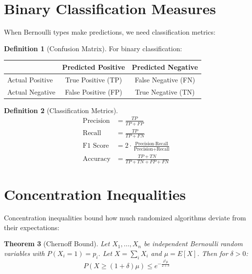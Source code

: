 \documentclass[11pt,twoside,openright]{book}
\theoremstyle{definition}
\newtheorem{definition}{Definition}[chapter]
\theoremstyle{plain}
\newtheorem{theorem}[definition]{Theorem}
\theoremstyle{remark}
\begin{document}
\section{Binary Classification Measures}

When Bernoulli types make predictions, we need classification metrics:

\begin{definition}[Confusion Matrix]
For binary classification:
\begin{center}
\begin{tabular}{l|cc}
& Predicted Positive & Predicted Negative \\
\hline
Actual Positive & True Positive (TP) & False Negative (FN) \\
Actual Negative & False Positive (FP) & True Negative (TN) \\
\end{tabular}
\end{center}
\end{definition}

\begin{definition}[Classification Metrics]
\begin{align}
\text{Precision} &= \frac{TP}{TP + FP} \\
\text{Recall} &= \frac{TP}{TP + FN} \\
\text{F1 Score} &= 2 \cdot \frac{\text{Precision} \cdot \text{Recall}}{\text{Precision} + \text{Recall}} \\
\text{Accuracy} &= \frac{TP + TN}{TP + TN + FP + FN}
\end{align}
\end{definition}

\section{Concentration Inequalities}

Concentration inequalities bound how much randomized algorithms deviate from their expectations:

\begin{theorem}[Chernoff Bound]
Let $X_1, \ldots, X_n$ be independent Bernoulli random variables with $P(X_i = 1) = p_i$. Let $X = \sum_i X_i$ and $\mu = E[X]$. Then for $\delta > 0$:
\begin{equation}
P(X \geq (1 + \delta)\mu) \leq e^{-\frac{\delta^2 \mu}{2 + \delta}}
\end{equation}
\end{theorem}
\end{document}
